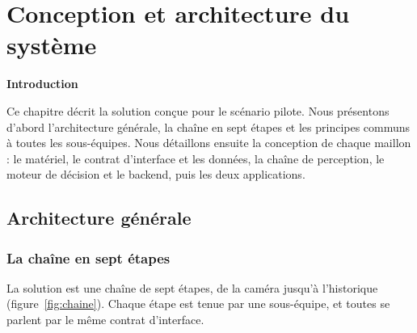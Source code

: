\chapter{\textcolor{mycolor}{\textbf{Conception et architecture du système}}}
\fancyhf{}
\fancyhead[L]{\small\itshape\nouppercase{\rightmark}}
\fancyfoot[L]{\small\itshape\nouppercase{\leftmark}}
\fancyfoot[R]{\small\itshape\thepage}
\renewcommand{\headrulewidth}{1pt}
\renewcommand{\footrulewidth}{0.4pt}

\vfill
\begin{flushright}{\Large\bfseries\textcolor{mycolor}{Introduction}}\end{flushright}

Ce chapitre décrit la solution conçue pour le scénario pilote. Nous présentons d'abord l'architecture générale, la chaîne en sept étapes et les principes communs à toutes les sous-équipes. Nous détaillons ensuite la conception de chaque maillon : le matériel, le contrat d'interface et les données, la chaîne de perception, le moteur de décision et le backend, puis les deux applications.

\clearpage

\section{Architecture générale}

\subsection{La chaîne en sept étapes}

La solution est une chaîne de sept étapes, de la caméra jusqu'à l'historique (figure~\ref{fig:chaine}). Chaque
étape est tenue par une sous-équipe, et toutes se parlent par le même contrat d'interface.


